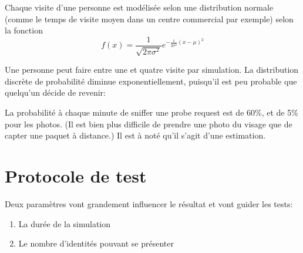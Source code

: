 Chaque visite d'une personne est modélisée selon une distribution normale (comme le temps de visite moyen dans un centre commercial par exemple) selon la fonction
\[f(x)=\frac{1}{\sqrt{2\pi \sigma^2}} e^{-\frac{1}{2\sigma^2}(x-\mu)^2}\]


Une personne peut faire entre une et quatre visite par simulation.
La distribution discrète de probabilité diminue exponentiellement, puisqu'il est peu probable que quelqu'un décide de revenir:


La probabilité à chaque minute de sniffer une probe request est de 60\%, et de 5\% pour les photos. (Il est bien plus difficile de prendre une photo du visage que de 
capter une paquet à distance.) Il est à noté qu'il s'agit d'une estimation.

\section{Protocole de test}
Deux paramètres vont grandement influencer le résultat et vont guider les tests:
\begin{enumerate}
    \item La durée de la simulation
    \item Le nombre d'identités pouvant se présenter
\end{enumerate}

